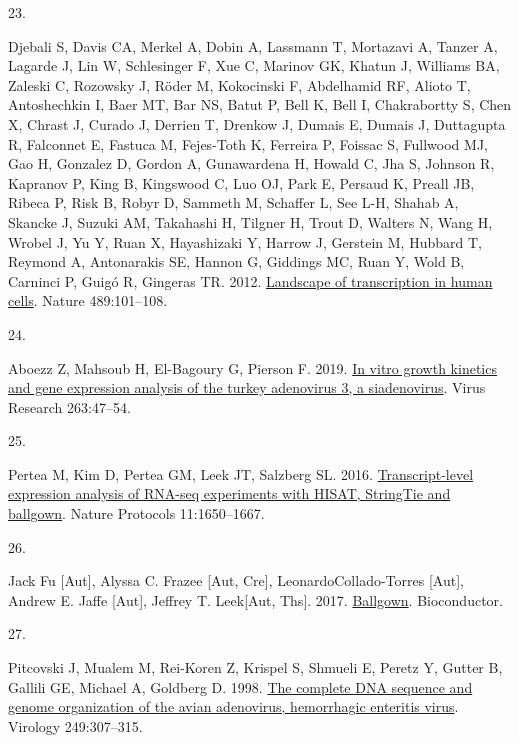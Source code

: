 \documentclass[
]{article}
\newlength{\cslhangindent}
\newlength{\csllabelwidth}
\newenvironment{CSLReferences}[2] %
 {\begin{list}{}{%
  \setlength{\itemindent}{0pt}
  \setlength{\leftmargin}{0pt}
  \setlength{\parsep}{0pt}
  \ifodd #1
   \setlength{\leftmargin}{\cslhangindent}
   \setlength{\itemindent}{-1\cslhangindent}
  \fi
  \setlength{\itemsep}{#2\baselineskip}}}
 {\end{list}}
\newcommand{\CSLLeftMargin}[1]{\parbox[t]{\csllabelwidth}{\strut#1\strut}}
\newcommand{\CSLRightInline}[1]{\parbox[t]{\linewidth - \csllabelwidth}{\strut#1\strut}}
\begin{document}
\begin{CSLReferences}{0}{1}
\CSLLeftMargin{23. }%
\CSLRightInline{Djebali S, Davis CA, Merkel A, Dobin A, Lassmann T,
Mortazavi A, Tanzer A, Lagarde J, Lin W, Schlesinger F, Xue C, Marinov
GK, Khatun J, Williams BA, Zaleski C, Rozowsky J, Röder M, Kokocinski F,
Abdelhamid RF, Alioto T, Antoshechkin I, Baer MT, Bar NS, Batut P, Bell
K, Bell I, Chakrabortty S, Chen X, Chrast J, Curado J, Derrien T,
Drenkow J, Dumais E, Dumais J, Duttagupta R, Falconnet E, Fastuca M,
Fejes-Toth K, Ferreira P, Foissac S, Fullwood MJ, Gao H, Gonzalez D,
Gordon A, Gunawardena H, Howald C, Jha S, Johnson R, Kapranov P, King B,
Kingswood C, Luo OJ, Park E, Persaud K, Preall JB, Ribeca P, Risk B,
Robyr D, Sammeth M, Schaffer L, See L-H, Shahab A, Skancke J, Suzuki AM,
Takahashi H, Tilgner H, Trout D, Walters N, Wang H, Wrobel J, Yu Y, Ruan
X, Hayashizaki Y, Harrow J, Gerstein M, Hubbard T, Reymond A,
Antonarakis SE, Hannon G, Giddings MC, Ruan Y, Wold B, Carninci P, Guigó
R, Gingeras TR. 2012.
\href{https://doi.org/10.1038/nature11233}{Landscape of transcription in
human cells}. Nature 489:101--108.}

\CSLLeftMargin{24. }%
\CSLRightInline{Aboezz Z, Mahsoub H, El-Bagoury G, Pierson F. 2019.
\href{https://www.sciencedirect.com/science/article/abs/pii/S016817021830529X?via\%3Dihub}{In
vitro growth kinetics and gene expression analysis of the turkey
adenovirus 3, a siadenovirus}. Virus Research 263:47--54.}

\CSLLeftMargin{25. }%
\CSLRightInline{Pertea M, Kim D, Pertea GM, Leek JT, Salzberg SL. 2016.
\href{https://doi.org/10.1038/nprot.2016.095}{Transcript-level
expression analysis of RNA-seq experiments with HISAT, StringTie and
ballgown}. Nature Protocols 11:1650--1667.}

\CSLLeftMargin{26. }%
\CSLRightInline{Jack Fu {[}Aut{]}, Alyssa C. Frazee {[}Aut, Cre{]},
LeonardoCollado-Torres {[}Aut{]}, Andrew E. Jaffe {[}Aut{]}, Jeffrey T.
Leek{[}Aut, Ths{]}. 2017.
\href{https://doi.org/10.18129/B9.BIOC.BALLGOWN}{Ballgown}.
Bioconductor.}

\CSLLeftMargin{27. }%
\CSLRightInline{Pitcovski J, Mualem M, Rei-Koren Z, Krispel S, Shmueli
E, Peretz Y, Gutter B, Gallili GE, Michael A, Goldberg D. 1998.
\href{https://doi.org/10.1006/viro.1998.9336}{The complete {DNA}
sequence and genome organization of the avian adenovirus, hemorrhagic
enteritis virus}. Virology 249:307--315.}


\end{CSLReferences}
\end{document}
